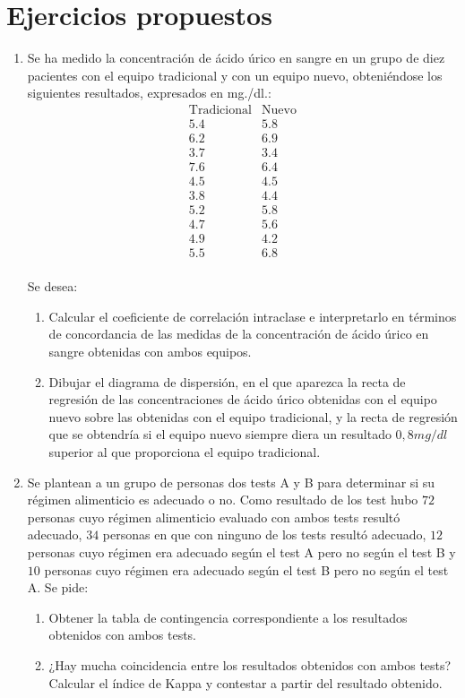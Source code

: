 \section{Ejercicios propuestos}
\begin{enumerate}[leftmargin=*]
\item Se ha medido la concentración de ácido úrico en sangre en un grupo de diez pacientes con el equipo tradicional y con un  equipo nuevo,
obteniéndose los siguientes resultados, expresados en mg./dl.:
\[
\begin{array}{cc}
\hline
\text{Tradicional} & \text{Nuevo}\\
\hline
5.4 & 5.8 \\
6.2 & 6.9 \\
3.7 & 3.4 \\
7.6 & 6.4 \\
4.5 & 4.5 \\
3.8 & 4.4 \\
5.2 & 5.8 \\
4.7 & 5.6 \\
4.9 & 4.2 \\
5.5 & 6.8 \\
\end{array}
\]

Se desea:
\begin{enumerate}
\item Calcular el coeficiente de correlación intraclase e interpretarlo en términos de concordancia de las medidas de la concentración de ácido úrico en sangre obtenidas con ambos equipos.
\item Dibujar el diagrama de dispersión, en el que aparezca la recta de regresión de las concentraciones de ácido úrico obtenidas con el equipo nuevo sobre las obtenidas con el equipo tradicional, y la recta de regresión que se obtendría si el equipo nuevo siempre diera un resultado $0,8 mg/dl$ superior al que proporciona el equipo tradicional.
\end{enumerate}

\item Se plantean a un grupo de personas dos tests A y B para determinar si su régimen alimenticio es adecuado o no. Como resultado de los
test hubo $72$ personas cuyo régimen alimenticio evaluado con ambos tests resultó adecuado, $34$ personas en que con ninguno de los tests
resultó adecuado, $12$ personas cuyo régimen era adecuado según el test A pero no según el test B y $10$ personas cuyo régimen era adecuado
según el test B pero no según el test A. Se pide:
\begin{enumerate}
\item Obtener la tabla de contingencia correspondiente a los resultados obtenidos con ambos tests.
\item ¿Hay mucha coincidencia entre los resultados obtenidos con ambos tests? Calcular el índice de Kappa y contestar a partir del resultado obtenido.
\end{enumerate}
\end{enumerate}